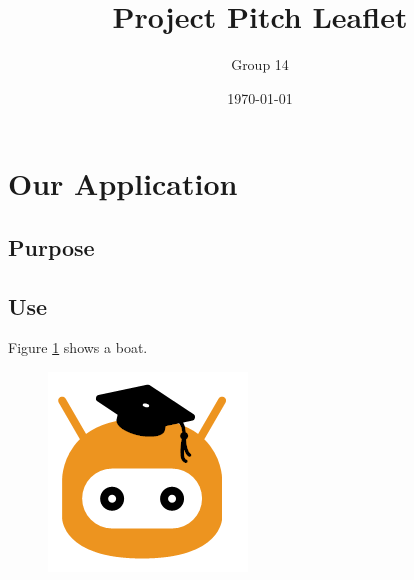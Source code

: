 \documentclass[a4wide, 11pt]{article}
\begin{document}
\title{Project Pitch Leaflet}

\author{Group 14}

\date{\today}         %

\maketitle            %

\section{Our Application}

\subsection{Purpose} 

\subsection{Use}

Figure \ref{fig:mockup} shows a boat.

\begin{figure}
  \begin{center}
  \includegraphics[]{placeholder.png}
  \end{center}
  \label{fig:mockup}
\end{figure}
\end{document}
